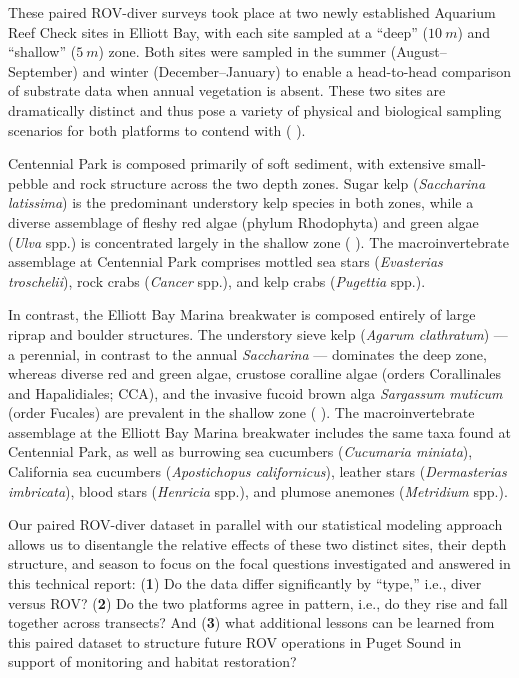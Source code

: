 \documentclass[11pt]{article}
\newcommand{\boxedref}[2]{%
	\begingroup
	\setlength{\fboxrule}{0.8pt}%
	\setlength{\fboxsep}{1.5pt}%
	\textcolor{linkcyan}{%
		\fbox{%
			\textcolor{black}{%
				\hyperref[#2]{#1~\ref*{#2}}%
			}%
		}%
	}%
	\endgroup
}
\newcommand{\figref}[1]{\boxedref{Fig.}{#1}}\newcommand{\tabref}[1]{\boxedref{Table}{#1}}
\begin{document}
These paired ROV-diver surveys took place at two newly established Aquarium 
Reef Check sites in Elliott Bay, with each site sampled at a ``deep'' ($10~m$) 
and ``shallow'' ($5~m$) zone.
Both sites were sampled in the summer (August--September) and winter 
(December--January) to enable a head-to-head comparison of substrate data when 
annual vegetation is absent.
These two sites are dramatically distinct and thus pose a variety of physical 
and biological sampling scenarios for both platforms to contend with 
(\figref{fig:site_map}).

Centennial Park is composed primarily of soft sediment, with extensive 
small-pebble and rock structure across the two depth zones. Sugar kelp 
(\textit{Saccharina latissima}) is the predominant understory kelp species in 
both zones, while a diverse assemblage of fleshy red algae (phylum Rhodophyta) 
and green algae (\textit{Ulva} spp.) is concentrated largely in the shallow 
zone (\figref{fig:CP}).
The macroinvertebrate assemblage at Centennial Park comprises mottled sea stars 
(\textit{Evasterias troschelii}), rock crabs (\textit{Cancer} spp.), and kelp 
crabs (\textit{Pugettia} spp.).

In contrast, the Elliott Bay Marina breakwater is composed entirely of large 
riprap and boulder structures. 
The understory sieve kelp (\textit{Agarum clathratum}) --- a perennial, in 
contrast to the annual \textit{Saccharina} --- dominates the deep zone, whereas 
diverse red and green algae, crustose coralline algae (orders Corallinales and 
Hapalidiales; CCA), and the invasive fucoid brown alga \textit{Sargassum 
muticum} (order Fucales) are prevalent in the shallow zone (\figref{fig:EBM}).
The macroinvertebrate assemblage at the Elliott Bay Marina breakwater includes 
the same taxa found at Centennial Park, as well as burrowing sea cucumbers 
(\textit{Cucumaria miniata}), California sea cucumbers 
(\textit{Apostichopus californicus}), leather stars 
(\textit{Dermasterias imbricata}), blood stars (\textit{Henricia} spp.), and 
plumose anemones (\textit{Metridium} spp.).

Our paired ROV-diver dataset in parallel with our statistical modeling approach 
allows us to disentangle the relative effects of these two distinct sites, 
their depth structure, and season to focus on the focal questions 
investigated and answered in this technical report: 
(\textbf{1}) 
Do the data differ significantly by ``type,'' i.e., diver versus ROV?
(\textbf{2})
Do the two platforms agree in pattern, i.e., do they rise and fall
together across transects?
And 
(\textbf{3})
what additional lessons can be learned from this paired dataset to structure
future ROV operations in Puget Sound in support of monitoring and habitat
restoration?
\end{document}
